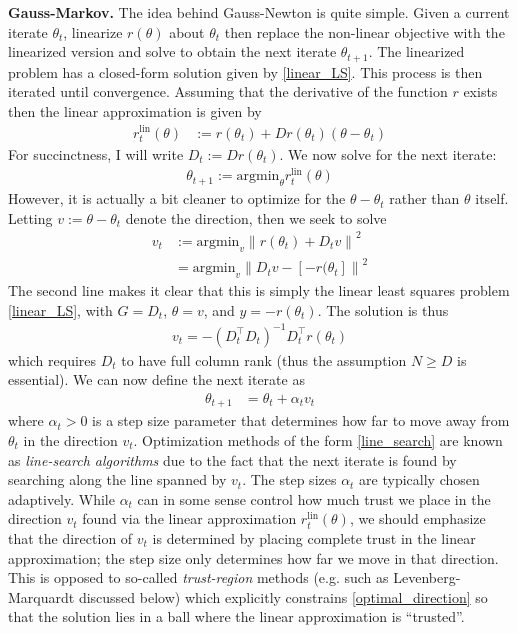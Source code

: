 \documentclass[12pt]{article}
\newcommand*{\norm}[1]{\left\lVert#1\right\rVert}
\begin{document}
\bigskip
\noindent
\textbf{Gauss-Markov.}
The idea behind Gauss-Newton is quite simple. Given a current iterate $\theta_t$, linearize $r(\theta)$ about $\theta_t$ then replace the non-linear objective with the linearized version and solve to obtain the 
next iterate $\theta_{t+1}$. The linearized problem has a closed-form solution given by \ref{linear_LS}. This process is then iterated until convergence. Assuming that the derivative of the function $r$ 
exists then the linear approximation is given by 
\begin{align}
r_t^{\text{lin}}(\theta) &:= r(\theta_t) + Dr(\theta_t)\left(\theta - \theta_t \right) 
\end{align}
For succinctness, I will write $D_t := Dr(\theta_t)$. We now solve for the next iterate:
\begin{align*}
\theta_{t + 1} := \text{argmin}_\theta r_t^{\text{lin}}(\theta)
\end{align*}
However, it is actually a bit cleaner to optimize for the  $\theta - \theta_t$ rather than $\theta$ itself. Letting $v := \theta - \theta_t$ denote the direction, then we seek to solve
\begin{align}
v_t &:= \text{argmin}_v \norm{r(\theta_t) + D_t v}^2 \label{optimal_direction} \\
	      &= \text{argmin}_v \norm{D_t v - [-r(\theta_t]}^2
\end{align}
The second line makes it clear that this is simply the linear least squares problem \ref{linear_LS}, with $G = D_t$, $\theta = v$, and $y = -r(\theta_t)$. The solution is thus 
\begin{align*}
v_t = -\left(D_t^\top D_t \right)^{-1} D_t^\top r(\theta_t)
\end{align*}
which requires $D_t$ to have full column rank (thus the assumption $N \geq D$ is essential). We can now define the next iterate as 
\begin{align}
\theta_{t + 1} &= \theta_t + \alpha_t v_t \label{line_search}
\end{align}
where $\alpha_t > 0$ is a step size parameter that determines how far to move away from $\theta_t$ in the direction $v_t$. Optimization methods of the form \ref{line_search} are known as 
\textit{line-search algorithms} due to the fact that the next iterate is found by searching along the line spanned by $v_t$. The step sizes $\alpha_t$ are typically chosen adaptively. While 
$\alpha_t$ can in some sense control how much trust we place in the direction $v_t$ found via the linear approximation $r_t^{\text{lin}}(\theta)$, we should emphasize that the direction of $v_t$ is 
determined by placing complete trust in the linear approximation; the step size only determines how far we move in that direction. This is opposed to so-called \textit{trust-region} methods
(e.g. such as Levenberg-Marquardt discussed below) which explicitly constrains \ref{optimal_direction} so that the solution lies in a ball where the linear approximation is ``trusted''. 
\end{document}
